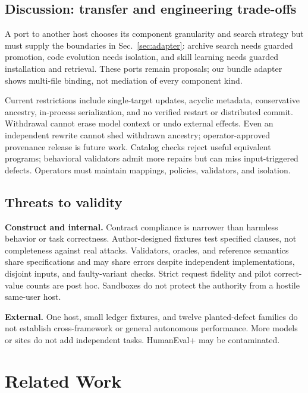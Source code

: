 \documentclass[letterpaper,journal]{IEEEtran}
\begin{document}
\subsection{Discussion: transfer and engineering trade-offs}\label{sec:discussion}
A port to another host chooses its component granularity and search strategy but must supply the boundaries in Sec.~\ref{sec:adapter}: archive search needs guarded promotion, code evolution needs isolation, and skill learning needs guarded installation and retrieval. These ports remain proposals; our bundle adapter shows multi-file binding, not mediation of every component kind.

Current restrictions include single-target updates, acyclic metadata, conservative ancestry, in-process serialization, and no verified restart or distributed commit. Withdrawal cannot erase model context or undo external effects. Even an independent rewrite cannot shed withdrawn ancestry; operator-approved provenance release is future work. Catalog checks reject useful equivalent programs; behavioral validators admit more repairs but can miss input-triggered defects. Operators must maintain mappings, policies, validators, and isolation.

\subsection{Threats to validity}
\textbf{Construct and internal.} Contract compliance is narrower than harmless behavior or task correctness. Author-designed fixtures test specified clauses, not completeness against real attacks. Validators, oracles, and reference semantics share specifications and may share errors despite independent implementations, disjoint inputs, and faulty-variant checks. Strict request fidelity and pilot correct-value counts are post hoc. Sandboxes do not protect the authority from a hostile same-user host.

\textbf{External.} One host, small ledger fixtures, and twelve planted-defect families do not establish cross-framework or general autonomous performance. More models or sites do not add independent tasks. HumanEval+ may be contaminated.



\section{Related Work}\label{sec:related}
\end{document}
